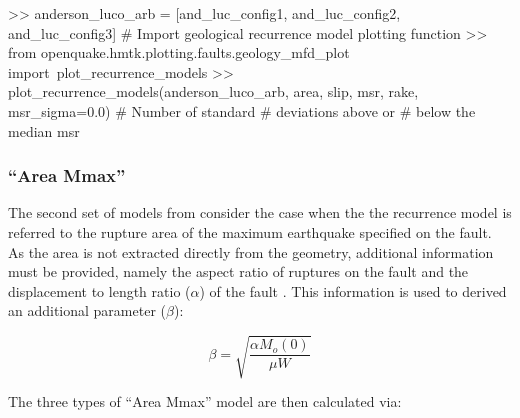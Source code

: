 \begin{python}[frame=single]
>> anderson_luco_arb = [and_luc_config1,
                        and_luc_config2,
                        and_luc_config3]
# Import geological recurrence model plotting function
>> from openquake.hmtk.plotting.faults.geology_mfd_plot import\
     plot_recurrence_models
>> plot_recurrence_models(anderson_luco_arb,
                          area,
                          slip,
                          msr,
                          rake,
                          msr_sigma=0.0) # Number of standard 
                                         # deviations above or
                                         # below the median msr 
\end{python}



\subsubsection{\textcite{AndersonLuco1983} ``Area Mmax''}

The second set of models from \textcite{AndersonLuco1983} consider the case when the the recurrence model is referred to the rupture area of the maximum earthquake specified on the fault. As the area is not extracted directly from the geometry, additional information must be provided, namely the aspect ratio of ruptures on the fault and the displacement to length ratio ($\alpha$) of the fault \parencite{Bungum2007}. This information is used to derived an additional parameter ($\beta$):

\begin{equation}
\beta=\sqrt{\frac{\alpha M_o \left( 0 \right)}{\mu W}}
\end{equation}

The three types of \textcite{AndersonLuco1983} ``Area Mmax'' model are then calculated via:

